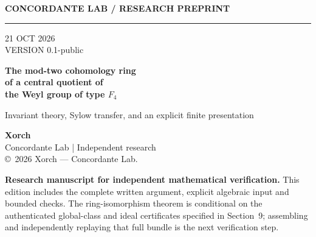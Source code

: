 \documentclass[11pt,a4paper]{article}
\theoremstyle{remark}\newtheorem{remark}[theorem]{Remark}
\begin{document}
\thispagestyle{empty}
\vspace*{-6mm}
\begin{minipage}[t]{0.72\linewidth}
{\sffamily\fontsize{10}{12}\selectfont\bfseries\textcolor{accent}{CONCORDANTE LAB \quad / \quad RESEARCH PREPRINT}}\\[2.5mm]
{\color{soft}\rule{\linewidth}{0.7pt}}
\end{minipage}\hfill
\begin{minipage}[t]{0.22\linewidth}
\raggedleft\sffamily\footnotesize\textcolor{soft}{21 OCT 2026\\VERSION 0.1-public}
\end{minipage}
\vspace{7mm}

{\color{deep}\sffamily\bfseries\fontsize{23}{28}\selectfont
The mod-two cohomology ring\\[1mm]
of a central quotient of\\[1mm]
the Weyl group of type \(F_4\)\par}
\vspace{4mm}
{\sffamily\large\textcolor{soft}{Invariant theory, Sylow transfer, and an explicit finite presentation}\par}
\vspace{8mm}
\begin{minipage}[t]{0.62\linewidth}
{\large\bfseries Xorch}\\[1.4mm]
{\sffamily\textcolor{soft}{Concordante Lab \quad | \quad Independent research}}\\[2mm]
\textcolor{soft}{\small \copyright\ 2026 Xorch --- Concordante Lab.}
\end{minipage}\hfill
\begin{minipage}[t]{0.34\linewidth}
\centering
{}
\end{minipage}
\vspace{6mm}

\noindent\colorbox{cream}{\parbox{\dimexpr\linewidth-2\fboxsep}{\small\sffamily
\textbf{Research manuscript for independent mathematical verification.} This edition includes the complete written argument, explicit algebraic input and bounded checks. The ring-isomorphism theorem is conditional on the authenticated global-class and ideal certificates specified in Section~9; assembling and independently replaying that full bundle is the next verification step.}}
\vspace{6mm}
\end{document}
